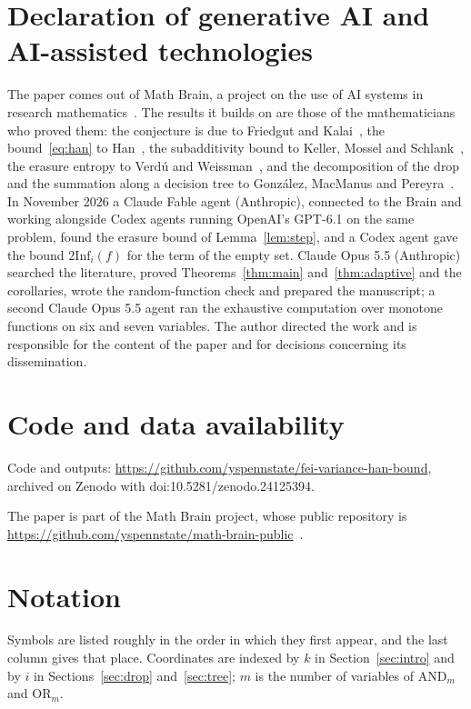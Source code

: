 \documentclass[11pt]{amsart}
\theoremstyle{remark}
\newcommand{\Inf}{\mathrm{Inf}}
\begin{document}
\section*{Declaration of generative AI and AI-assisted technologies}
The paper comes out of Math Brain, a project on the use of AI systems in research mathematics~\cite{BrainFramework,MathBrainRepo}.
The results it builds on are those of the mathematicians who proved them: the conjecture is due to Friedgut and
Kalai~\cite{FK96}, the bound~\eqref{eq:han} to Han~\cite{Han}, the subadditivity bound to Keller, Mossel and
Schlank~\cite{KMS}, the erasure entropy to Verd\'u and Weissman~\cite{VW08}, and the decomposition of the drop and the
summation along a decision tree to Gonz\'alez, MacManus and Pereyra~\cite{GMP}. In November 2026 a Claude Fable agent
(Anthropic), connected to the Brain and working alongside Codex agents running OpenAI's GPT-6.1 on the same problem,
found the erasure bound of Lemma~\ref{lem:step}, and a Codex agent gave the bound $2\Inf_i(f)$ for the term of the empty
set. Claude Opus 5.5 (Anthropic) searched the literature, proved Theorems~\ref{thm:main} and~\ref{thm:adaptive} and the
corollaries, wrote the random-function check and prepared the manuscript; a second Claude Opus 5.5 agent ran the
exhaustive computation over monotone functions on six and seven variables. The author directed the work and is
responsible for the content of the paper and for decisions concerning its dissemination.

\section*{Code and data availability}
Code and outputs: \url{https://github.com/yspennstate/fei-variance-han-bound}, archived on Zenodo with doi:10.5281/zenodo.24125394.

The paper is part of the Math Brain project, whose public repository is
\url{https://github.com/yspennstate/math-brain-public}~\cite{MathBrainRepo}.

\appendix
\section{Notation}\label{app:notation}

Symbols are listed roughly in the order in which they first appear, and the last column gives that place. Coordinates are
indexed by $k$ in Section~\ref{sec:intro} and by $i$ in Sections~\ref{sec:drop} and~\ref{sec:tree}; $m$ is the number of
variables of $\mathrm{AND}_m$ and $\mathrm{OR}_m$.
\end{document}
